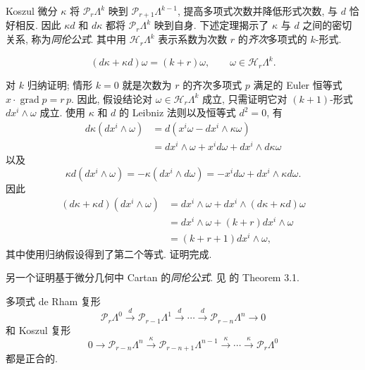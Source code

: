 {Koszul 微分 $\kappa$ 将 $\mathcal P_r\Lambda^k$ 映到 $\mathcal P_{r+1}\Lambda^{k-1}$, 提高多项式次数并降低形式次数, 与 $d$ 恰好相反. 因此 $\kappa d$ 和 $d\kappa$ 都将 $\mathcal P_r\Lambda^k$ 映到自身. 下述定理揭示了 $\kappa$ 与 $d$ 之间的密切关系, 称为\emph{同伦公式}. 其中用 $\mathcal H_r\Lambda^k$ 表示系数为次数 $r$ 的\emph{齐次}多项式的 $k$-形式.}


\begin{Theorem}\label{thm:koszul-homotopy}
\[
(d\kappa+\kappa d)\omega=(k+r)\omega,\qquad\omega\in\mathcal H_r\Lambda^k.
\]
\end{Theorem}

\begin{Proof}
{对 $k$ 归纳证明; 情形 $k=0$ 就是次数为 $r$ 的齐次多项式 $p$ 满足的 Euler 恒等式 $x\cdot\operatorname{grad}p=r\,p$. 因此, 假设结论对 $\omega\in\mathcal H_r\Lambda^k$ 成立, 只需证明它对 $(k+1)$-形式 $dx^i\wedge\omega$ 成立. 使用 $\kappa$ 和 $d$ 的 Leibniz 法则以及恒等式 $d^2=0$, 有}
\[
\begin{aligned}
d\kappa(dx^i\wedge\omega)&=d(x^i\omega-dx^i\wedge\kappa\omega)\\
&=dx^i\wedge\omega+x^i d\omega+dx^i\wedge d\kappa\omega
\end{aligned}
\]
{以及}
\[
\kappa d(dx^i\wedge\omega)=-\kappa(dx^i\wedge d\omega)=-x^i d\omega+dx^i\wedge\kappa d\omega.
\]
{因此}
\[
\begin{aligned}
(d\kappa+\kappa d)(dx^i\wedge\omega)&=dx^i\wedge\omega+dx^i\wedge(d\kappa+\kappa d)\omega\\
&=dx^i\wedge\omega+(k+r)dx^i\wedge\omega\\
&=(k+r+1)dx^i\wedge\omega,
\end{aligned}
\]
{其中使用归纳假设得到了第二个等式. 证明完成.}
\end{Proof}


\begin{Remark}\label{rem:koszul-cartan-proof}
{另一个证明基于微分几何中 Cartan 的\emph{同伦公式}. 见  的 Theorem 3.1.}
\end{Remark}


\begin{Corollary}\label{cor:polynomial-de-rham-exactness}
{多项式 de Rham 复形}
\[
\mathcal P_r\Lambda^0\xrightarrow{d}\mathcal P_{r-1}\Lambda^1\xrightarrow{d}\cdots\xrightarrow{d}\mathcal P_{r-n}\Lambda^n\to0
\]
{和 Koszul 复形}
\[
0\to\mathcal P_{r-n}\Lambda^n\xrightarrow{\kappa}\mathcal P_{r-n+1}\Lambda^{n-1}\xrightarrow{\kappa}\cdots\xrightarrow{\kappa}\mathcal P_r\Lambda^0
\]
{都是正合的.}
\end{Corollary}

